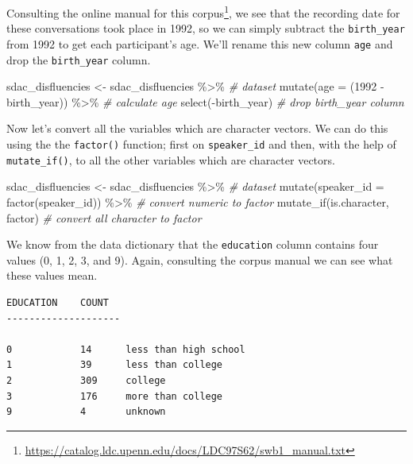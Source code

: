 \documentclass[
]{article}
\newenvironment{Shaded}{\begin{snugshade}}{\end{snugshade}}
\newcommand{\AttributeTok}[1]{\textcolor[rgb]{0.77,0.63,0.00}{#1}}
\newcommand{\CommentTok}[1]{\textcolor[rgb]{0.56,0.35,0.01}{\textit{#1}}}
\newcommand{\DecValTok}[1]{\textcolor[rgb]{0.00,0.00,0.81}{#1}}
\newcommand{\FunctionTok}[1]{\textcolor[rgb]{0.00,0.00,0.00}{#1}}
\newcommand{\NormalTok}[1]{#1}
\newcommand{\OtherTok}[1]{\textcolor[rgb]{0.56,0.35,0.01}{#1}}
\newcommand{\SpecialCharTok}[1]{\textcolor[rgb]{0.00,0.00,0.00}{#1}}
\DeclareRobustCommand{\href}[2]{#2\footnote{\url{#1}}}
\begin{document}
Consulting the \href{https://catalog.ldc.upenn.edu/docs/LDC97S62/swb1_manual.txt}{online manual for this corpus}, we see that the recording date for these conversations took place in 1992, so we can simply subtract the \texttt{birth\_year} from 1992 to get each participant's age. We'll rename this new column \texttt{age} and drop the \texttt{birth\_year} column.

\begin{Shaded}
\begin{Highlighting}[]
\NormalTok{sdac\_disfluencies }\OtherTok{\textless{}{-}} 
\NormalTok{  sdac\_disfluencies }\SpecialCharTok{\%\textgreater{}\%} \CommentTok{\# dataset}
  \FunctionTok{mutate}\NormalTok{(}\AttributeTok{age =}\NormalTok{ (}\DecValTok{1992} \SpecialCharTok{{-}}\NormalTok{ birth\_year)) }\SpecialCharTok{\%\textgreater{}\%} \CommentTok{\# calculate age}
  \FunctionTok{select}\NormalTok{(}\SpecialCharTok{{-}}\NormalTok{birth\_year) }\CommentTok{\# drop \textasciigrave{}birth\_year\textasciigrave{} column}
\end{Highlighting}
\end{Shaded}

Now let's convert all the variables which are character vectors. We can do this using the the \texttt{factor()} function; first on \texttt{speaker\_id} and then, with the help of \texttt{mutate\_if()}, to all the other variables which are character vectors.

\begin{Shaded}
\begin{Highlighting}[]
\NormalTok{sdac\_disfluencies }\OtherTok{\textless{}{-}} 
\NormalTok{  sdac\_disfluencies }\SpecialCharTok{\%\textgreater{}\%} \CommentTok{\# dataset}
  \FunctionTok{mutate}\NormalTok{(}\AttributeTok{speaker\_id =} \FunctionTok{factor}\NormalTok{(speaker\_id)) }\SpecialCharTok{\%\textgreater{}\%} \CommentTok{\# convert numeric to factor}
  \FunctionTok{mutate\_if}\NormalTok{(is.character, factor) }\CommentTok{\# convert all character to factor}
\end{Highlighting}
\end{Shaded}

We know from the data dictionary that the \texttt{education} column contains four values (0, 1, 2, 3, and 9). Again, consulting the corpus manual we can see what these values mean.

\begin{verbatim}
EDUCATION    COUNT
--------------------

0            14      less than high school
1            39      less than college
2            309     college
3            176     more than college
9            4       unknown
\end{verbatim}
\end{document}
